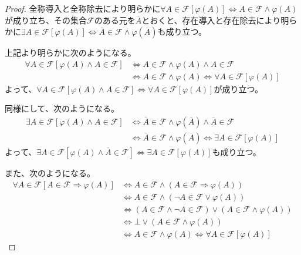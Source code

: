 \documentclass[a4paper]{jsarticle}
\begin{document}
\begin{proof}
全称導入と全称除去により明らかに$\forall A\in \mathcal{F}\left[ \varphi(A) \right] \Leftrightarrow A\in \mathcal{F \land}\varphi(A)$が成り立ち、その集合$\mathcal{F}$のある元を$\overline{A}$とおくと、存在導入と存在除去により明らかに$\exists A\in \mathcal{F}\left[ \varphi(A) \right] \Leftrightarrow \overline{A}\in \mathcal{F \land}\varphi\left( \overline{A} \right)$も成り立つ。\par
上記より明らかに次のようになる。
\begin{align*}
\forall A\in \mathcal{F}\left[ \varphi(A) \land A\in \mathcal{F} \right] &\Leftrightarrow A\in \mathcal{F \land}\varphi(A) \land A\in \mathcal{F} \\
&\Leftrightarrow A\in \mathcal{F \land}\varphi(A) \Leftrightarrow \forall A\in \mathcal{F}\left[ \varphi(A) \right]
\end{align*}
よって、$\forall A\in \mathcal{F}\left[ \varphi(A) \land A\in \mathcal{F} \right] \Leftrightarrow \forall A\in \mathcal{F}\left[ \varphi(A) \right]$が成り立つ。\par
同様にして、次のようになる。
\begin{align*}
\exists A\in \mathcal{F}\left[ \varphi(A) \land A\in \mathcal{F} \right] &\Leftrightarrow \overline{A}\in \mathcal{F \land}\varphi\left( \overline{A} \right) \land \overline{A}\in \mathcal{F} \\
&\Leftrightarrow \overline{A}\in \mathcal{F \land}\varphi\left( \overline{A} \right) \Leftrightarrow \exists A\in \mathcal{F}\left[ \varphi(A) \right] 
\end{align*}
よって、$\exists A\in \mathcal{F}\left[ \varphi(A) \land \overline{A}\in \mathcal{F} \right] \Leftrightarrow \exists A\in \mathcal{F}\left[ \varphi(A) \right]$も成り立つ。\par
また、次のようになる。
\begin{align*}
\forall A\in \mathcal{F}\left[ A\in \mathcal{F \Rightarrow}\varphi(A) \right] &\Leftrightarrow A\in \mathcal{F \land}\left( A\in \mathcal{F \Rightarrow}\varphi(A) \right) \\
&\Leftrightarrow A\in \mathcal{F \land}\left( \neg A\in \mathcal{F \vee}\varphi(A) \right) \\
&\Leftrightarrow \left( A\in \mathcal{F \land \neg}A\in \mathcal{F} \right) \vee \left( A\in \mathcal{F \land}\varphi(A) \right) \\
&\Leftrightarrow \bot \vee \left( A\in \mathcal{F \land}\varphi(A) \right) \\
&\Leftrightarrow A\in \mathcal{F \land}\varphi(A) \Leftrightarrow \forall A\in \mathcal{F}\left[ \varphi(A) \right]

\end{align*}
\end{proof}
\end{document}
